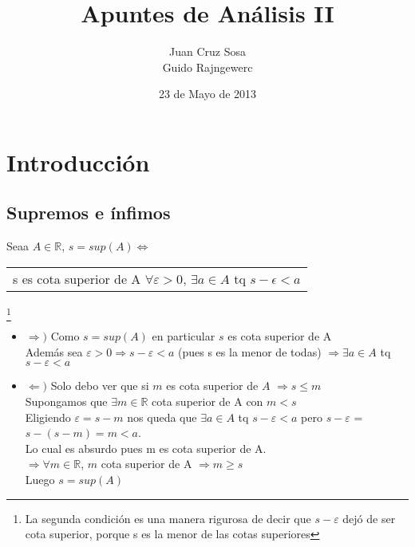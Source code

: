 \documentclass[a4paper,10pt]{article}
\title{ Apuntes de Análisis II }
\author{Juan Cruz Sosa \\ Guido Rajngewerc}
\date{23 de Mayo de 2013}
\begin{document}
\maketitle
\tableofcontents 
\clearpage

\section{Introducción}
\subsection{Supremos e ínfimos}
\propiedad Seaa $A \in \mathbb{R}$, $s = sup(A) \Leftrightarrow$
\begin{tabular}{l}
	s es cota superior de A
	\cr $\forall \varepsilon > 0$, $\exists a \in A$ tq $s-\epsilon < a$
\end{tabular}
\footnote{La segunda condición es una manera rigurosa de decir que $s-\varepsilon$ dejó de ser cota superior, porque s es la menor de las cotas superiores} 
\ifversionlarga
\\
\begin{demo}
	\begin{itemize}
		\item $\Rightarrow)$ Como $s=sup(A)$ en particular $s$ es cota superior de A \\
		Además sea $\varepsilon > 0 \Rightarrow s-\varepsilon<a$ (pues s es la
		menor de todas) $\Rightarrow \exists a \in A$ tq $s - \varepsilon < a$
		\item $\Leftarrow)$ Solo debo ver que si $m$ es cota superior de $A$ $\Rightarrow s \leq m$ \\
		Supongamos que $\exists m \in \mathbb{R}$ cota superior de A con $m < s$ \\
		Eligiendo $\varepsilon=s-m$ nos queda que $\exists a \in A$ tq $s-\varepsilon < a$ pero $s-\varepsilon$ = $s-(s-m)=m<a$. \\
		Lo cual es absurdo pues m es cota superior de A. \\
		$\Rightarrow \forall m \in \mathbb{R}$, $m$ cota superior de A $\Rightarrow m \geq s$ \\
		Luego $s=sup(A)$
	\end{itemize}
\end{demo}
\fi
\end{document}
